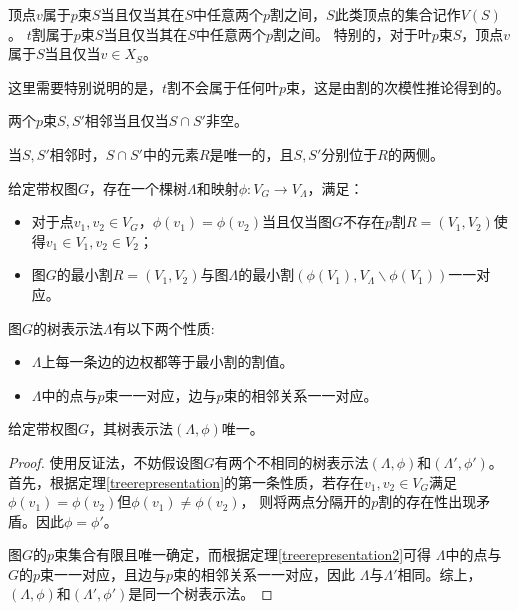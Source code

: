\begin{definition}[$p$束内部的顶点和$t$割]
  顶点$v$属于$p$束$S$当且仅当其在$S$中任意两个$p$割之间，$S$此类顶点的集合记作$V(S)$。
  $t$割属于$p$束$S$当且仅当其在$S$中任意两个$p$割之间。
  特别的，对于叶$p$束$S$，顶点$v$属于$S$当且仅当$v\in X_S$。
\end{definition}
这里需要特别说明的是，$t$割不会属于任何叶$p$束，这是由割的次模性推论得到的。
\begin{definition}[相邻的$p$束]
  两个$p$束$S,S'$相邻当且仅当$S\cap S'$非空。
\end{definition}
当$S,S'$相邻时，$S\cap S'$中的元素$R$是唯一的，且$S,S'$分别位于$R$的两侧。
\begin{theorem}[树表示法]\cite{dinitz1976structure}
  \label{treerepresentation}
  给定带权图$G$，存在一个棵树$\Lambda$和映射$\phi:V_G\rightarrow V_\Lambda$，满足：
    \begin{itemize}
        \item 对于点$v_1,v_2\in V_G$，$\phi(v_1)=\phi(v_2)$当且仅当图$G$不存在$p$割$R=(V_1,V_2)$使得$v_1\in V_1,v_2\in V_2$；
        \item 图$G$的最小割$R=(V_1,V_2)$与图$\Lambda$的最小割$(\phi(V_1),V_\Lambda\backslash\phi(V_1))$一一对应。
    \end{itemize}
\end{theorem}

\begin{theorem}[树表示法的性质]\cite{dinitz1976structure}
  \label{treerepresentation2}
  图$G$的树表示法$\Lambda$有以下两个性质:
  \begin{itemize}
    \item $\Lambda$上每一条边的边权都等于最小割的割值。
    \item $\Lambda$中的点与$p$束一一对应，边与$p$束的相邻关系一一对应。
  \end{itemize}
\end{theorem}

\begin{lemma}[树表示法的唯一性]
  \label{treeunique}
  给定带权图$G$，其树表示法$(\Lambda,\phi)$唯一。
\end{lemma}
\begin{proof}
  使用反证法，不妨假设图$G$有两个不相同的树表示法$(\Lambda,\phi)$和$(\Lambda',\phi')$。
  首先，根据定理\ref{treerepresentation}的第一条性质，若存在$v_1,v_2\in V_G$满足$\phi(v_1)=\phi(v_2)$但$\phi(v_1)\neq\phi(v_2)$，
  则将两点分隔开的$p$割的存在性出现矛盾。因此$\phi=\phi'$。

  图$G$的$p$束集合有限且唯一确定，而根据定理\ref{treerepresentation2}可得
  $\Lambda$中的点与$G$的$p$束一一对应，且边与$p$束的相邻关系一一对应，因此
  $\Lambda$与$\Lambda'$相同。综上，$(\Lambda,\phi)$和$(\Lambda',\phi')$是同一个树表示法。
\end{proof}



